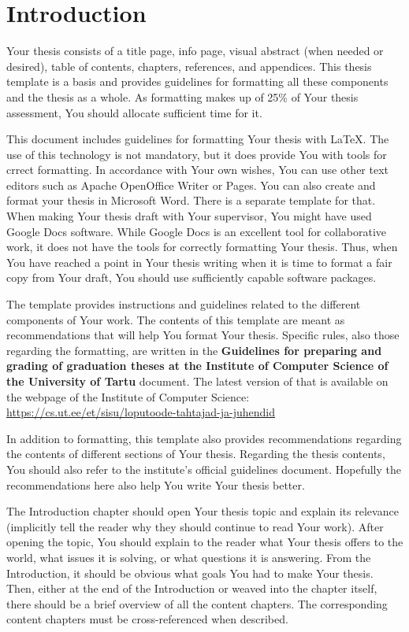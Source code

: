 \section{Introduction} \label{Introduction}

Your thesis consists of a title page, info page, visual abstract (when needed or desired), table of contents, chapters, references, and appendices. This thesis template is a basis and provides guidelines for formatting all these components and the thesis as a whole. As formatting makes up of 25\% of Your thesis assessment, You should allocate sufficient time for it.

This document includes guidelines for formatting Your thesis with LaTeX. The use of this technology is not mandatory, but it does provide You with tools for crrect formatting. In accordance with Your own wishes, You can use other text editors such as Apache OpenOffice Writer or Pages. You can also create and format your thesis in Microsoft Word. There is a separate template for that. When making Your thesis draft with Your supervisor, You might have used Google Docs software. While Google Docs is an excellent tool for collaborative work, it does not have the tools for correctly formatting Your thesis. Thus, when You have reached a point in Your thesis writing when it is time to format a fair copy from Your draft, You should use sufficiently capable software packages.

The template provides instructions and guidelines related to the different components of Your work. The contents of this template are meant as recommendations that will help You format Your thesis. Specific rules, also those regarding the formatting, are written in the \textbf{Guidelines for preparing and grading of graduation theses at the Institute of Computer Science of the University of Tartu} document. The latest version of that is available on the webpage of the Institute of Computer Science: \url{https://cs.ut.ee/et/sisu/loputoode-tahtajad-ja-juhendid}


In addition to formatting, this template also provides recommendations regarding the contents of different sections of Your thesis. Regarding the thesis contents, You should also refer to the institute’s official guidelines document. Hopefully the recommendations here also help You write Your thesis better.

The Introduction chapter should open Your thesis topic and explain its relevance (implicitly tell the reader why they should continue to read Your work). After opening the topic, You should explain to the reader what Your thesis offers to the world, what issues it is solving, or what questions it is answering. From the Introduction, it should be obvious what goals You had to make Your thesis. Then, either at the end of the Introduction or weaved into the chapter itself, there should be a brief overview of all the content chapters. The corresponding content chapters must be cross-referenced when described.

